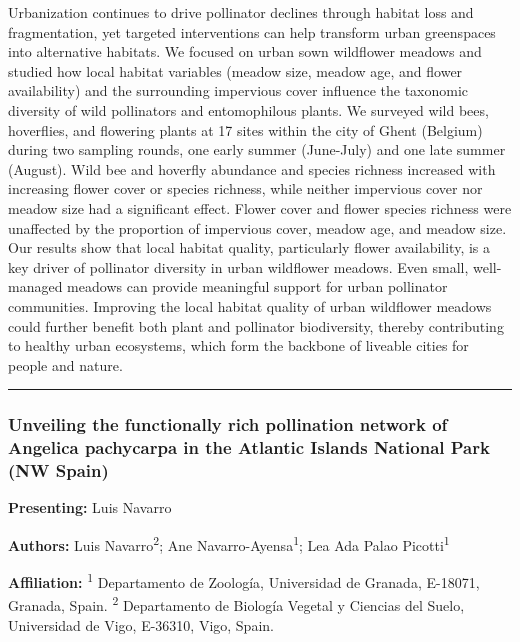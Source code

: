 \documentclass[
  letterpaper,
  DIV=11,
  numbers=noendperiod]{scrartcl}
\begin{document}
Urbanization continues to drive pollinator declines through habitat loss
and fragmentation, yet targeted interventions can help transform urban
greenspaces into alternative habitats. We focused on urban sown
wildflower meadows and studied how local habitat variables (meadow size,
meadow age, and flower availability) and the surrounding impervious
cover influence the taxonomic diversity of wild pollinators and
entomophilous plants. We surveyed wild bees, hoverflies, and flowering
plants at 17 sites within the city of Ghent (Belgium) during two
sampling rounds, one early summer (June-July) and one late summer
(August). Wild bee and hoverfly abundance and species richness increased
with increasing flower cover or species richness, while neither
impervious cover nor meadow size had a significant effect. Flower cover
and flower species richness were unaffected by the proportion of
impervious cover, meadow age, and meadow size. Our results show that
local habitat quality, particularly flower availability, is a key driver
of pollinator diversity in urban wildflower meadows. Even small,
well-managed meadows can provide meaningful support for urban pollinator
communities. Improving the local habitat quality of urban wildflower
meadows could further benefit both plant and pollinator biodiversity,
thereby contributing to healthy urban ecosystems, which form the
backbone of liveable cities for people and nature.

\begin{center}\rule{0.5\linewidth}{0.5pt}\end{center}

\subsubsection{Unveiling the functionally rich pollination network of
Angelica pachycarpa in the Atlantic Islands National Park (NW
Spain)}\label{unveiling-the-functionally-rich-pollination-network-of-angelica-pachycarpa-in-the-atlantic-islands-national-park-nw-spain-1}

\textbf{Presenting:} Luis Navarro

\textbf{Authors:} Luis Navarro\textsuperscript{2}; Ane
Navarro-Ayensa\textsuperscript{1}; Lea Ada Palao
Picotti\textsuperscript{1}

\textbf{Affiliation:} \textsuperscript{1} Departamento de Zoología,
Universidad de Granada, E-18071, Granada, Spain. \textsuperscript{2}
Departamento de Biología Vegetal y Ciencias del Suelo, Universidad de
Vigo, E-36310, Vigo, Spain.
\end{document}
